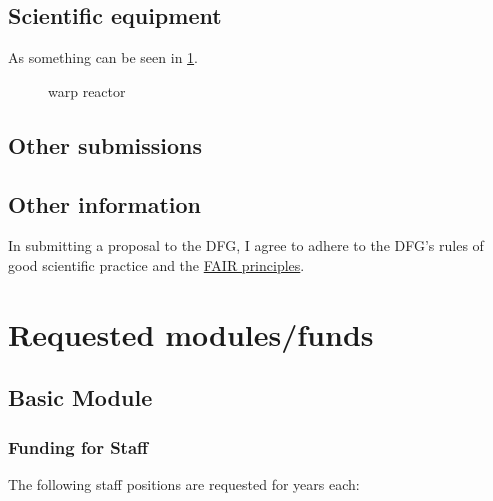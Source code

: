 \documentclass{scrartcl}
\begin{document}
\subsection{Scientific equipment}
As something can be seen in \cref{fig:some_nice_graph}.

\begin{figure}
\centering
{}
\caption{warp reactor}
\label{fig:some_nice_graph}
\end{figure}

\subsection{Other submissions}

\subsection{Other information}
In submitting a proposal to the DFG, I agree to adhere to the DFG's rules of good scientific practice and the \href{https://www.nature.com/articles/sdata201618}{FAIR principles}.

\section{Requested modules/funds}

\subsection{Basic Module}

\subsubsection{Funding for Staff}
\begin{funds}
The following staff positions are requested for  years each:


\end{funds}
\end{document}
